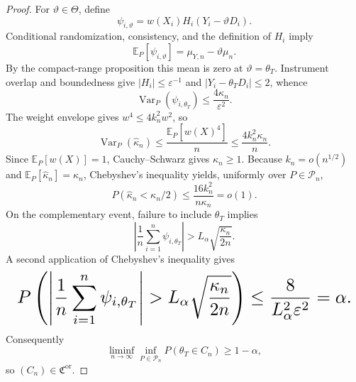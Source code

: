 \documentclass{article}
\begin{document}
\begin{proof}
For \(\vartheta\in\Theta\), define
\[
 \psi_{i,\vartheta}=w(X_i)H_i(Y_i-\vartheta D_i).
\]
Conditional randomization, consistency, and the definition of \(H_i\) imply
\[
 \mathbb E_P[\psi_{i,\vartheta}]
 =\mu_{Y,n}-\vartheta\mu_n.
\]
By the compact-range proposition this mean is zero at \(\vartheta=\theta_T\). Instrument overlap and boundedness give \(|H_i|\le\varepsilon^{-1}\) and \(|Y_i-\theta_TD_i|\le2\), whence
\[
 \operatorname{Var}_P(\psi_{i,\theta_T})
 \le \frac{4\kappa_n}{\varepsilon^2}.
\]
The weight envelope gives \(w^4\le4k_n^2w^2\), so
\[
 \operatorname{Var}_P(\widehat\kappa_n)
 \le\frac{\mathbb E_P[w(X)^4]}n
 \le\frac{4k_n^2\kappa_n}{n}.
\]
Since \(\mathbb E_P[w(X)]=1\), Cauchy--Schwarz gives \(\kappa_n\ge1\). Because \(k_n=o(n^{1/2})\) and \(\mathbb E_P[\widehat\kappa_n]=\kappa_n\), Chebyshev's inequality yields, uniformly over \(P\in\mathcal P_n\),
\[
 P(\widehat\kappa_n<\kappa_n/2)
 \le\frac{16k_n^2}{n\kappa_n}=o(1).
\]
On the complementary event, failure to include \(\theta_T\) implies
\[
 \left|\frac1n\sum_{i=1}^n\psi_{i,\theta_T}\right|
 >L_\alpha\sqrt{\frac{\kappa_n}{2n}}.
\]
A second application of Chebyshev's inequality gives
\[
\makebox[\linewidth][c]{\resizebox{0.98\linewidth}{!}{\(\displaystyle P\left(
 \left|\frac1n\sum_{i=1}^n\psi_{i,\theta_T}\right|
 >L_\alpha\sqrt{\frac{\kappa_n}{2n}}
 \right)
 \le\frac{8}{L_\alpha^2\varepsilon^2}=\alpha.\)}}
\]
Consequently
\[
 \liminf_{n\to\infty}\inf_{P\in\mathcal P_n}
 P(\theta_T\in C_n)\ge1-\alpha,
\]
so \((C_n)\in\mathfrak C^{\mathrm{or}}\).


\end{proof}
\end{document}
